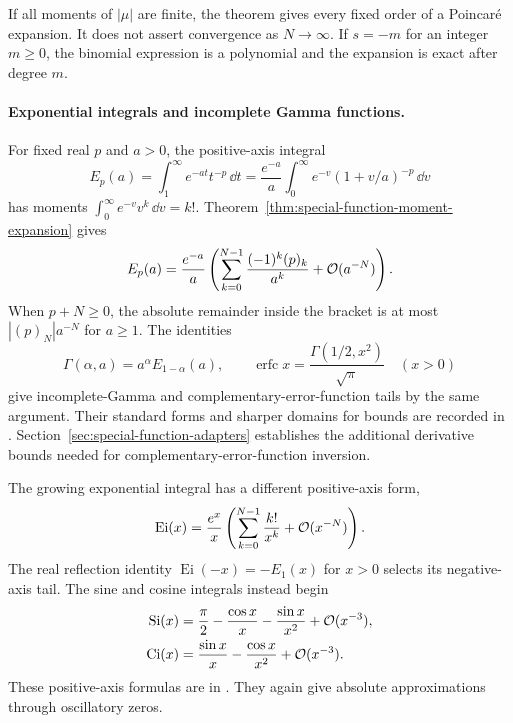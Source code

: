 If all moments of $|\mu|$ are finite, the theorem gives every fixed
order of a Poincar\'e expansion. It does not assert convergence as
$N\to\infty$. If $s=-m$ for an integer $m\ge0$, the binomial expression
is a polynomial and the expansion is exact after degree $m$.

\paragraph{Exponential integrals and incomplete Gamma functions.}
For fixed real $p$ and $a>0$, the positive-axis integral
\[
 E_p(a)=\int_1^\infty e^{-at}t^{-p}\,\dd t
       =\frac{e^{-a}}a\int_0^\infty
                  e^{-v}(1+v/a)^{-p}\,\dd v
\]
has moments $\int_0^\infty e^{-v}v^k\,\dd v=k!$.
Theorem~\ref{thm:special-function-moment-expansion} gives
\begin{equation}
 E_p(a)=\frac{e^{-a}}a
       \left(\sum_{k=0}^{N-1}\frac{(-1)^k(p)_k}{a^k}
                   +\mathcal O(a^{-N})\right).
 \label{eq:special-function-exponential-integral}
\end{equation}
When $p+N\ge0$, the absolute remainder inside the bracket is at most
$|(p)_N|a^{-N}$ for $a\ge1$.
The identities
\[
 \Gamma(\alpha,a)=a^\alpha E_{1-\alpha}(a),\qquad
 \operatorname{erfc}x=\frac{\Gamma(1/2,x^2)}{\sqrt{\pi}}
       \quad(x>0)
\]
give incomplete-Gamma and complementary-error-function tails by the
same argument. Their standard forms and sharper domains for bounds
are recorded in \cite[\S\S8.11(i), 7.12(i)]{dlmf}.
Section~\ref{sec:special-function-adapters} establishes the additional
derivative bounds needed for complementary-error-function inversion.

The growing exponential integral has a different positive-axis form,
\begin{equation}
 \operatorname{Ei}(x)=\frac{e^x}{x}
       \left(\sum_{k=0}^{N-1}\frac{k!}{x^k}+\mathcal O(x^{-N})\right).
 \label{eq:special-function-growing-exponential-integral}
\end{equation}
The real reflection identity
$\operatorname{Ei}(-x)=-E_1(x)$ for $x>0$ selects its negative-axis
tail. The sine and cosine integrals instead begin
\begin{equation}
\begin{aligned}
 \operatorname{Si}(x)&=\frac{\pi}{2}-\frac{\cos x}{x}
                              -\frac{\sin x}{x^2}+\mathcal O(x^{-3}),\\
 \operatorname{Ci}(x)&=\frac{\sin x}{x}
                              -\frac{\cos x}{x^2}+\mathcal O(x^{-3}).
\end{aligned}
\label{eq:special-function-oscillatory-integrals}
\end{equation}
These positive-axis formulas are in \cite[\S6.12]{dlmf}.
They again give absolute approximations through oscillatory zeros.

